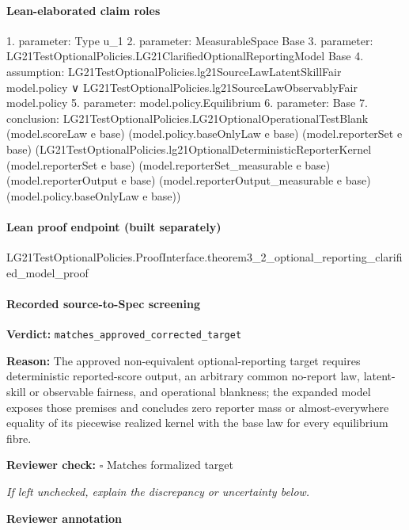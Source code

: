 \documentclass[10pt]{article}
\newcommand{\reviewerbox}{%
  \par\noindent\fbox{\parbox{0.96\linewidth}{\rule{0pt}{0.38in}}}\par
}
\newcommand{\reviewmatch}[1]{%
  \par\noindent\textbf{Reviewer check:} $\square$\; #1\par
  \noindent\emph{If left unchecked, explain the discrepancy or uncertainty below.}\par
}
\begin{document}
\paragraph{Lean-elaborated claim roles}\begin{ReviewVerbatim}
1. parameter: Type u_1
2. parameter: MeasurableSpace Base
3. parameter: LG21TestOptionalPolicies.LG21ClarifiedOptionalReportingModel Base
4. assumption: LG21TestOptionalPolicies.lg21SourceLawLatentSkillFair model.policy ∨
  LG21TestOptionalPolicies.lg21SourceLawObservablyFair model.policy
5. parameter: model.policy.Equilibrium
6. parameter: Base
7. conclusion: LG21TestOptionalPolicies.LG21OptionalOperationalTestBlank (model.scoreLaw e base) (model.policy.baseOnlyLaw e base)
  (model.reporterSet e base)
  (LG21TestOptionalPolicies.lg21OptionalDeterministicReporterKernel (model.reporterSet e base)
    (model.reporterSet_measurable e base) (model.reporterOutput e base) (model.reporterOutput_measurable e base)
    (model.policy.baseOnlyLaw e base))
\end{ReviewVerbatim}

\paragraph{Lean proof endpoint (built separately)}\begin{ReviewVerbatim}
LG21TestOptionalPolicies.ProofInterface.theorem3_2_optional_reporting_clarified_model_proof
\end{ReviewVerbatim}

\paragraph{Recorded source-to-Spec screening}
\textbf{Verdict:} \texttt{matches\_approved\_corrected\_target}
\\
{\raggedright
\textbf{Reason:} The approved non-\allowbreak{}equivalent optional-\allowbreak{}reporting target requires deterministic reported-\allowbreak{}score output, an arbitrary common no-\allowbreak{}report law, latent-\allowbreak{}skill or observable fairness, and operational blankness;\allowbreak{} the expanded model exposes those premises and concludes zero reporter mass or almost-\allowbreak{}everywhere equality of its piecewise realized kernel with the base law for every equilibrium fibre.\allowbreak{}
\par}
\reviewmatch{Matches formalized target}
\noindent\textbf{Reviewer annotation}\par
\reviewerbox
\clearpage
\hypertarget{source-claim-7d055230dc3ae301}{}
\end{document}
